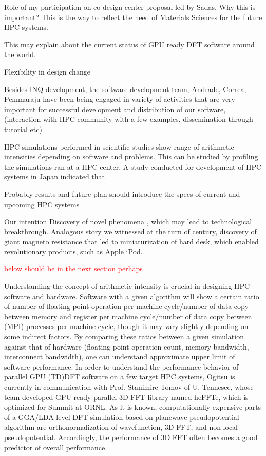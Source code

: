 Role of my participation on co-design center proposal led by Sadas. Why this is important? This is the way to reflect the need of Materials Sciences for the future HPC systems.


This may explain about the current status of GPU ready DFT software around the world. 

Flexibility in design change 

Besides INQ development, the software development team, Andrade, Correa, Pemmaraju have been being engaged in variety of activities that are very important for successful development and distribution of our software,  (interaction with HPC community with a few examples, dissemination through tutorial etc)

HPC simulations performed in scientific studies show range of arithmetic intensities depending on software and problems. This can be studied by profiling the simulations ran at a HPC center. A study conducted for development of HPC systems in Japan indicated that 

Probably results and future plan should introduce the specs of current and upcoming HPC systems

Our intention Discovery of novel phenomena , which may lead to  technological breakthrough.  Analogous story we witnessed at the turn of century, discovery of giant magneto resistance that led to miniaturization of hard desk, which enabled revolutionary products, such as Apple iPod. 

\textcolor{red}{below should be in the next section perhaps}

Understanding the concept of arithmetic intensity is crucial in designing HPC software and hardware. Software with a given algorithm will show a certain ratio of number of floating point operation per machine cycle/number of data copy between memory and register per machine cycle/number of data copy between (MPI) processes per machine cycle, though it may vary slightly depending on some indirect factors. By comparing these ratios between a given simulation against that of hardware (floating point operation count, memory bandwidth, interconnect bandwidth), one can understand approximate upper limit of software performance. In order to understand the performance behavior of parallel GPU (TD)DFT software on a few target HPC systems, Ogitsu is currently in communication with Prof. Stanimire Tomov of U. Tennesee, whose team developed GPU ready parallel 3D FFT library named heFFTe, which is optimized for Summit at ORNL. As it is known, computationally expensive parts of a GGA/LDA level DFT simulation based on planewave pseudopotential algorithm are orthonormalization of wavefunction, 3D-FFT, and non-local pseudopotential. Accordingly, the performance of 3D FFT often becomes a good predictor of overall performance.




\clearpage